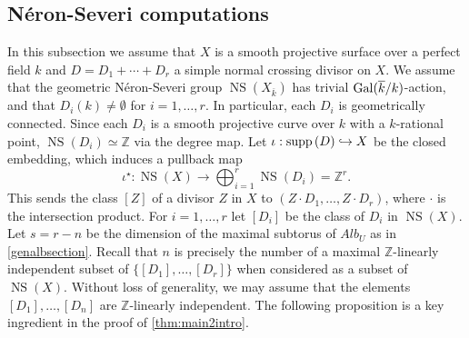 \documentclass[12pt]{amsart}
\theoremstyle{remark}
\newcommand{\Z}{{\mathbb Z}}
\renewcommand{\1}{{\mathbb{S}}}
\newcommand{\Gal}{{\rm Gal}}
\newcommand{\supp}{{\rm supp}\,}
\newcommand{\NS}{{\operatorname{NS}}}
\newcommand{\<}{\langle}
\renewcommand{\>}{\rangle}
\begin{document}
\subsection{N\'{e}ron-Severi computations}\label{NSXstuff}

In this subsection we assume that $X$ is a smooth projective surface over a perfect field $k$ and $D=D_1+\cdots+D_r$ a simple normal crossing divisor on $X$. We assume that the geometric N\'{e}ron-Severi group $\NS(X_{\overline{k}})$ has trivial $\Gal(\overline{k}/k)$-action, and that $D_i(k)\neq\emptyset$ for $i=1,\ldots, r$. In particular, each $D_i$ is geometrically connected. 
Since each $D_i$ is a smooth projective curve over $k$ with a $k$-rational point, $\NS(D_i)\simeq\Z$ via the degree map. Let $\iota:\supp(D)\hookrightarrow X$ be the closed embedding, which induces a pullback map 
	\[\iota^\star:\NS(X)\to\bigoplus_{i=1}^r \NS(D_i)=\Z^r.\] 
    This sends the class $[Z]$ of a divisor $Z$ in $X$ to $(Z\cdot D_1,\ldots, Z\cdot D_r)$, where $\cdot$ is the intersection product. 
For $i=1,\ldots, r$ let $[D_i]$ be the class of $D_i$ in $\NS(X)$. Let 
$s=r-n$ be the dimension of the maximal subtorus of $Alb_U$ as in \autoref{genalbsection}. Recall that $n$ is precisely the number of a maximal $\Z$-linearly independent subset of $\{[D_1],\ldots, [D_r]\}$ when considered as a subset of $\NS(X)$. Without loss of generality, we may assume that the elements $[D_1],\ldots, [D_n]$ are $\Z$-linearly independent.
	The following proposition is a key ingredient in the proof of  \autoref{thm:main2intro}. 
	
\end{document}
